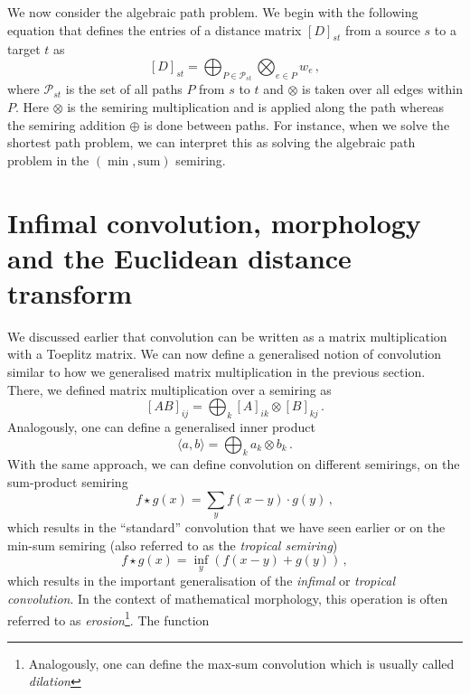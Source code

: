 We now consider the algebraic path problem. We begin with the
following equation that defines the entries of a distance matrix
${[D]}_{st}$ from a source $s$ to a target $t$ as
\begin{equation*}
  {[D]}_{st} = \bigoplus_{P \in \mathcal{P}_{st}} \bigotimes_{e \in P} w_e\,,
\end{equation*}
where $\mathcal{P}_{st}$ is the set of all paths $P$ from $s$ to $t$
and $\otimes$ is taken over all edges within $P$. Here $\otimes$ is
the semiring multiplication and is applied along the path whereas the
semiring addition $\oplus$ is done between paths. For instance, when
we solve the shortest path problem, we can interpret this as solving
the algebraic path problem in the $(\min, \text{sum})$ semiring.

\section{Infimal convolution, morphology and the Euclidean distance
  transform}
We discussed earlier that convolution can be written as a matrix
multiplication with a Toeplitz matrix. We can now define a generalised
notion of convolution similar to how we generalised matrix
multiplication in the previous section. There, we defined matrix
multiplication over a semiring as
\begin{equation*}
  {[AB]}_{ij} = \bigoplus_k {[A]}_{ik} \otimes {[B]}_{kj}\,.
\end{equation*}
Analogously, one can define a generalised inner product
\begin{equation*}
  \langle a,b \rangle = \bigoplus_k a_k \otimes b_k\,.
\end{equation*}
With the same approach, we can define convolution on different
semirings, \eg on the sum-product semiring
\begin{equation*}
  f \star g(x) = \sum_y f(x-y) \cdot g(y)\,,
\end{equation*}
which results in the ``standard'' convolution that we have seen
earlier or on the min-sum semiring (also referred to as the
\emph{tropical semiring})
\begin{equation*}
  f \star g(x) = \inf_y\left( f(x-y) + g(y)\right)\,,
\end{equation*}
which results in the important generalisation of the \emph{infimal} or
\emph{tropical convolution}. In the context of mathematical
morphology, this operation is often referred to as
\emph{erosion}\footnote{Analogously, one can define the max-sum
  convolution which is usually called \emph{dilation}}. The function
